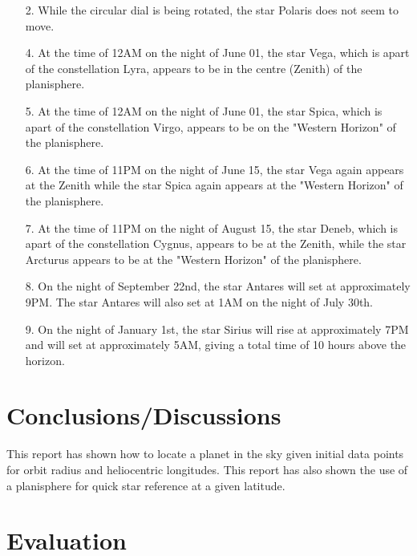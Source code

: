 \documentclass{article}
\begin{document}
\begin{enumerate}
\item[2.] While the circular dial is being rotated, the star Polaris does not seem to move. 
\item[4.] At the time of 12AM on the night of June 01, the star Vega, which is apart of the constellation Lyra, appears to 
be in the centre (Zenith) of the planisphere.
\item[5.] At the time of 12AM on the night of June 01, the star Spica, which is apart of the constellation Virgo, appears
to be on the "Western Horizon" of the planisphere.
\item[6.] At the time of 11PM on the night of June 15, the star Vega again appears at the Zenith while the star Spica
again appears at the "Western Horizon" of the planisphere.
\item[7.] At the time of 11PM on the night of August 15, the star Deneb, which is apart of the constellation Cygnus, appears
to be at the Zenith, while the star Arcturus appears to be at the "Western Horizon" of the planisphere.
\item[8.] On the night of September 22nd, the star Antares will set at approximately 9PM. The star Antares will also
set at 1AM on the night of July 30th.
\item[9.] On the night of January 1st, the star Sirius will rise at approximately 7PM and will set at approximately 5AM, 
giving a total time of 10 hours above the horizon.
\end{enumerate}


\section{Conclusions/Discussions}

This report has shown how to locate a planet in the sky given initial data points for orbit radius and heliocentric 
longitudes. This report has also shown the use of a planisphere for quick star reference at a given latitude.


\section{Evaluation}
\end{document}
